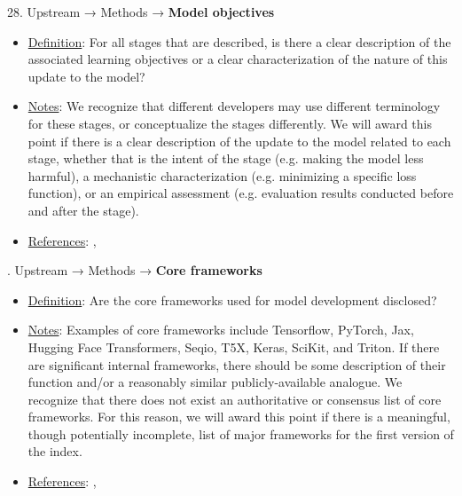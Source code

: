 28. Upstream → Methods → \textbf{Model objectives}
\vspace{-\parskip}
\begin{itemize}
	\item
	\underline{Definition}: For all stages that are described, is there a clear description of the associated learning objectives or a clear characterization of the nature of this update to the model?
	\item
	\underline{Notes}: We recognize that different developers may use different terminology for these stages, or conceptualize the stages differently. We will award this point if there is a clear description of the update to the model related to each stage, whether that is the intent of the stage (e.g. making the model less harmful), a mechanistic characterization (e.g. minimizing a specific loss function), or an empirical assessment (e.g. evaluation results conducted before and after the stage).
	\item
	\underline{References}: \citet{mitchell2019model}, \citet{chung2022scaling}
\end{itemize} \vspace{\baselineskip}


. Upstream → Methods → \textbf{Core frameworks}
\vspace{-\parskip}
\begin{itemize}
	\item
	\underline{Definition}: Are the core frameworks used for model development disclosed?
	\item
	\underline{Notes}: Examples of core frameworks include Tensorflow, PyTorch, Jax, Hugging Face Transformers, Seqio, T5X, Keras, SciKit, and Triton. If there are significant internal frameworks, there should be some description of their function and/or a reasonably similar publicly-available analogue. We recognize that there does not exist an authoritative or consensus list of core frameworks. For this reason, we will award this point if there is a meaningful, though potentially incomplete, list of major frameworks for the first version of the index.
	\item
	\underline{References}: \citet{mitchell2019model}, \citet{chung2022scaling}
\end{itemize} \vspace{\baselineskip}


